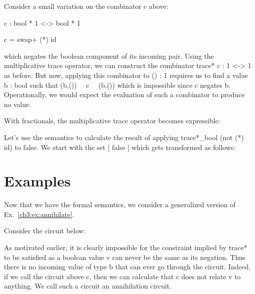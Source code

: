 \documentclass{llncs}
\begin{document}
\begin{example}
\label{ch3:ex:annihilate}
Consider a small variation on the combinator {{c}} above:

{{c : bool * 1 <-> bool * 1}} 

{{c = swap+ (*) id }}

\noindent which negates the boolean component of its incoming
pair. Using the multiplicative trace operator, we can construct the
combinator {{trace* c : 1 <-> 1}} as before. But now, applying this
combinator to {{() : 1}} requires us to find a value {{b : bool}} such
that {{(b,()) ~~c~~ (b,())}} which is impossible since {{c}} negates
{{b}}. Operationally, we would expect the evaluation of such a
combinator to produce no value. 
\end{example}

With fractionals, the multiplicative trace operator becomes expressible:


Let's use the semantics to calculate the result of applying
{{trace*_{bool} (not (*) id)}} to {{false}}. We start
with the set {{ {[ false ]} }} which gets transformed as follows:

\section{Examples} 

Now that we have the formal semantics, we consider a generalized version of
Ex.~\ref{ch3:ex:annihilate}.

\begin{example}[Annihilation]
\label{ch3:ex;annihilation}
Consider the circuit below:
\begin{center}
\end{center}
As motivated earlier, it is clearly impossible for the constraint implied by
{{trace*}} to be satisfied as a boolean value {{v}} can never be the same as
its negation. Thus there is no incoming value of type {{b}} that can ever go
through the circuit. Indeed, if we call the circuit above {{c}}, then we can
calculate that {{c}} does not relate {{v}} to anything. We call such a
circuit an annihilation circuit.
\end{example}
\end{document}
